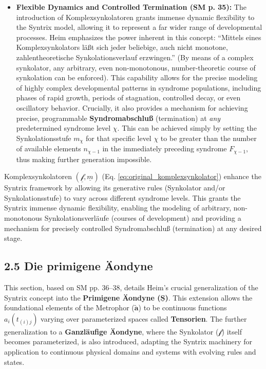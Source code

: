 \documentclass[12pt]{article}
\newcommand{\q}[1]{\enquote{#1}}
\newcommand{\metrophor}{\bm{\widetilde{a}}}
\newcommand{\synkolator}{\mathcal{f}}
\newcommand{\synkolationsstufe}{m}
\newcommand{\syndrom}{F}
\begin{document}
\begin{itemize}
    \item \textbf{Flexible Dynamics and Controlled Termination (SM p. 35):}
    The introduction of Komplexsynkolatoren grants immense dynamic flexibility to the Syntrix model, allowing it to represent a far wider range of developmental processes. Heim emphasizes the power inherent in this concept: \q{Mittels eines Komplexsynkolators läßt sich jeder beliebige, auch nicht monotone, zahlentheoretische Synkolationsverlauf erzwingen.} (By means of a complex synkolator, any arbitrary, even non-monotonous, number-theoretic course of synkolation can be enforced). This capability allows for the precise modeling of highly complex developmental patterns in syndrome populations, including phases of rapid growth, periods of stagnation, controlled decay, or even oscillatory behavior. Crucially, it also provides a mechanism for achieving precise, programmable \textbf{Syndromabschluß} (termination) at \textit{any} predetermined syndrome level \( \chi \). This can be achieved simply by setting the Synkolationsstufe \( \synkolationsstufe_\chi \) for that specific level \( \chi \) to be greater than the number of available elements \( n_{\chi-1} \) in the immediately preceding syndrome \( \syndrom_{\chi-1} \), thus making further generation impossible.
\end{itemize}

Komplexsynkolatoren \( (\underline{\synkolator}, \underline{\synkolationsstufe}) \) (Eq. \eqref{eq:original_komplexsynkolator}) enhance the Syntrix framework by allowing its generative rules (Synkolator and/or Synkolationsstufe) to vary across different syndrome levels. This grants the Syntrix immense dynamic flexibility, enabling the modeling of arbitrary, non-monotonous Synkolationsverläufe (courses of development) and providing a mechanism for precisely controlled Syndromabschluß (termination) at any desired stage.

\subsection{2.5 Die primigene Äondyne}
\label{sec:aeondyne}

This section, based on SM pp. 36--38, details Heim's crucial generalization of the Syntrix concept into the \textbf{Primigene \"{A}ondyne (\(\underline{\bm{S}}\))}. This extension allows the foundational elements of the Metrophor (\(\metrophor\)) to be continuous functions \(a_i(t_{(i)j})\) varying over parameterized spaces called \textbf{Tensorien}. The further generalization to a \textbf{Ganzläufige \"{A}ondyne}, where the Synkolator (\(\synkolator\)) itself becomes parameterized, is also introduced, adapting the Syntrix machinery for application to continuous physical domains and systems with evolving rules and states.
\end{document}
